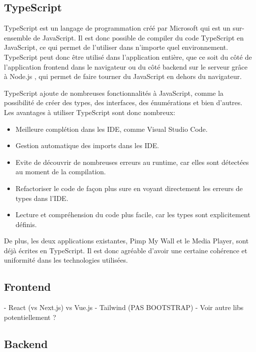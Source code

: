 \subsection{TypeScript}

TypeScript \cite{typescript} est un langage de programmation créé par Microsoft qui est un sur-ensemble de JavaScript. Il est donc possible de compiler du code TypeScript en JavaScript, ce qui permet de l'utiliser dans n'importe quel environnement. TypeScript peut donc être utilisé dans l'application entière, que ce soit du côté de l'application frontend dans le navigateur ou du côté backend sur le serveur grâce à Node.js \cite{nodejs}, qui permet de faire tourner du JavaScript en dehors du navigateur.

TypeScript ajoute de nombreuses fonctionnalités à JavaScript, comme la possibilité de créer des types, des interfaces, des énumérations et bien d'autres. Les avantages à utiliser TypeScript sont donc nombreux:

\begin{itemize}
  \item Meilleure complétion dans les IDE, comme Visual Studio Code.
  \item Gestion automatique des imports dans les IDE.
  \item Evite de découvrir de nombreuses erreurs au runtime, car elles sont détectées au moment de la compilation.
  \item Refactoriser le code de façon plus sure en voyant directement les erreurs de types dans l'IDE.
  \item Lecture et compréhension du code plus facile, car les types sont explicitement définis.
\end{itemize}

De plus, les deux applications existantes, Pimp My Wall et le Media Player, sont déjà écrites en TypeScript. Il est donc agréable d'avoir une certaine cohérence et uniformité dans les technologies utilisées.

\subsection{Frontend}

- React (vs Next.js) vs Vue.js
- Tailwind (PAS BOOTSTRAP)
- Voir autre libs potentiellement ?

\subsection{Backend}

